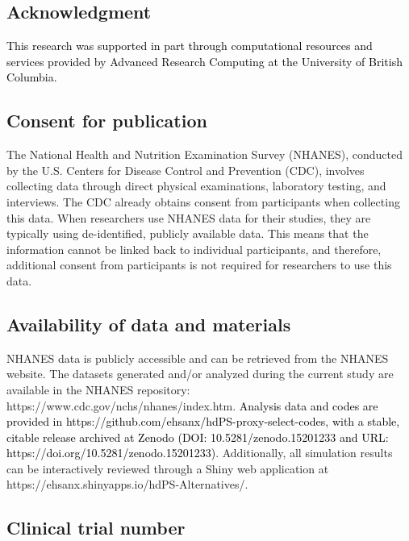 \documentclass[10pt,letterpaper]{article}
\begin{document}
\subsection*{Acknowledgment}\label{acknowledgment}

\textcolor{black}{This research was supported in part through computational resources and services provided by Advanced Research Computing at the University of British Columbia.}

\subsection*{Consent for publication}\label{consent-for-publication}

The National Health and Nutrition Examination Survey (NHANES), conducted
by the U.S. Centers for Disease Control and Prevention (CDC), involves
collecting data through direct physical examinations, laboratory
testing, and interviews. The CDC already obtains consent from
participants when collecting this data. When researchers use NHANES data
for their studies, they are typically using de-identified, publicly
available data. This means that the information cannot be linked back to
individual participants, and therefore, additional consent from
participants is not required for researchers to use this data.

\subsection*{Availability of data and
materials}\label{availability-of-data-and-materials}

NHANES data is publicly accessible and can be retrieved from the NHANES
website. The datasets generated and/or analyzed during the current study
are available in the NHANES repository:
https://www.cdc.gov/nchs/nhanes/index.htm.
\textcolor{black}{Analysis data and codes are provided in https://github.com/ehsanx/hdPS-proxy-select-codes, with a stable, citable release archived at Zenodo (DOI: 10.5281/zenodo.15201233 and URL: https://doi.org/10.5281/zenodo.15201233)}.
Additionally, all simulation results can be interactively reviewed
through a Shiny web application at
https://ehsanx.shinyapps.io/hdPS-Alternatives/.

\subsection*{Clinical trial number}\label{clinical-trial-number}
\end{document}
